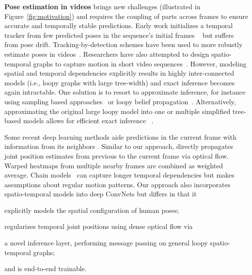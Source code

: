 \documentclass[10pt,twocolumn,letterpaper]{article}
\newcommand{\figref}[1]{Figure~\ref{#1}}
\begin{document}
\textbf{Pose estimation in videos} brings new challenges (illustrated in \figref{fig:motivation}) and requires the coupling of parts across frames to ensure accurate and temporally stable predictions.
Early work initializes a temporal tracker from few predicted poses in the sequence's initial frames ~\cite{sidenbladh2000stochastic} but suffers from pose drift. Tracking-by-detection schemes have been used to more robustly estimate poses in videos~\cite{fragkiadaki2013pose,park2011n,ramanan2005strike}.
Researchers have also attempted to design spatio-temporal graphs to capture motion in short video sequences~\cite{cherian2014mixing,ferrari2008progressive,lee2009human,sapp2011parsing,sminchisescu2003estimating,wang2008gaussian,zhang2015human,wang2014video,xiaohan2015joint}. However, modeling spatial and temporal dependencies explicitly results in highly inter-connected models (i.e., loopy graphs with large tree-width) and exact inference becomes again intractable. One solution is to resort to
approximate inference, for instance using sampling based approaches~\cite{sminchisescu2003estimating,wang2008gaussian} or loopy belief propagation~\cite{lee2009human,ferrari2008progressive}. Alternatively, approximating the original large loopy model into one or multiple simplified tree-based models allows for efficient exact inference ~\cite{cherian2014mixing,zhang2015human}.

Some recent deep learning methods aide predictions in the current frame with information from its neighbors \cite{jain2014modeep}. Similar to our approach, \cite{pfister2015flowing} directly propagates joint position estimates from previous to the current frame via optical flow. Warped heatmaps from multiple nearby frames are combined as weighted average. Chain models~\cite{gkioxari2016chained} can capture longer temporal dependencies but makes assumptions about regular motion patterns. Our approach also incorporates spatio-temporal models into deep ConvNets but differs in that it
\begin{inparaenum}[(i)]
  \item explicitly models the spatial configuration of human poses;
  \item regularizes temporal joint positions using dense optical flow via
  \item a novel inference layer, performing message passing on general loopy spatio-temporal graphs;
  \item and is end-to-end trainable.
\end{inparaenum}
\end{document}
